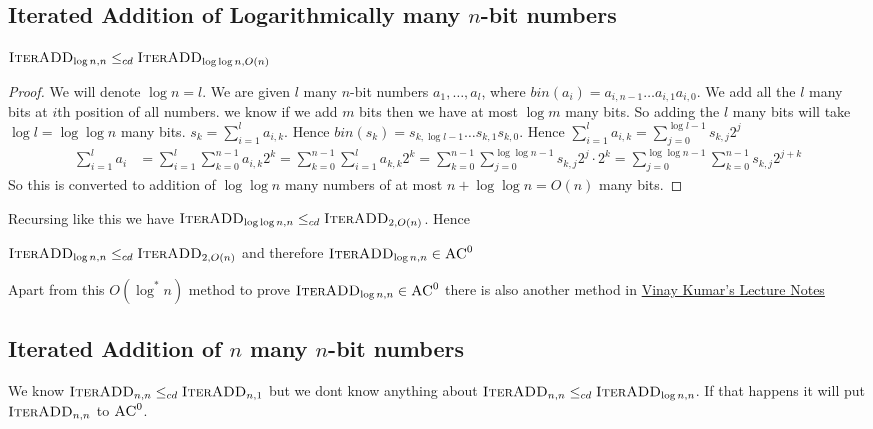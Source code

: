 \subsection{Iterated Addition of Logarithmically many $n$-bit numbers}
\begin{theorem}\label{addlognloglogn}
	$\textsc{IterADD}_{\log n,n}\leq_{cd} \textsc{IterADD}_{\log\log n,O(n)}$
\end{theorem}
\begin{proof}
	We will denote $\log n=l$. We are given $l$ many $n$-bit numbers $a_1,\dots,a_l$, where $bin(a_i)=a_{i,n-1}\dots a_{i,1}a_{i,0}$. We add all the $l$ many bits at $i$th position of all numbers. we know if we add $m$ bits then we have at most $\log m$ many bits. So adding the $l$ many bits will take $\log l=\log\log n$ many bits. $s_{k}=\sum\limits_{i=1}^l a_{i,k}$. Hence $bin(s_k)= s_{k,\log l-1}\dots s_{k,1}s_{k,0}$. Hence $\sum\limits_{i=1}^{l}a_{i,k}=\sum\limits_{j=0}^{\log l-1}s_{k,j}2^j$
\begin{align*}
	\sum\limits_{i=1}^{l}a_{i}&=\sum\limits_{i=1}^{l}\sum\limits_{k=0}^{n-1}a_{i,k}2^k=\sum\limits_{k=0}^{n-1}\sum\limits_{i=1}^{l}a_{k,k}2^k= \sum\limits_{k=0}^{n-1} \sum\limits_{j=0}^{\log\log n-1}s_{k,j}2^j\cdot 2^k= \sum\limits_{j=0}^{\log\log n-1}\sum\limits_{k=0}^{n-1}s_{k,j}2^{j+k}
\end{align*}So this is converted to addition of $\log\log n$ many numbers of at most $n+\log\log n=O(n)$ many bits. 
\end{proof}
Recursing like this we have $\textsc{IterADD}_{\log\log n,n}\leq _{cd} \textsc{IterADD}_{2,O(n)}$. Hence
\begin{theorem}\label{addlognac0}
$\textsc{IterADD}_{\log n,n}\leq _{cd} \textsc{IterADD}_{2,O(n)}$ and therefore $\textsc{IterADD}_{\log n,n}\in \textsc{AC}^0$
\end{theorem}

\begin{remark}
	Apart from this $O(\log^*n)$ method to prove $\textsc{IterADD}_{\log n,n}\in \textsc{AC}^0$ there is also another method in \href{https://www.iarcs.org.in/activities/elnotes/pdf/cc.pdf}{Vinay Kumar's Lecture Notes}
\end{remark}
\subsection{Iterated Addition of $n$ many $n$-bit numbers}
We know $\textsc{IterADD}_{n,n}\leq _{cd} \textsc{IterADD}_{n,1}$ but we dont know anything about $\textsc{IterADD}_{n,n}\leq_{cd} \textsc{IterADD}_{\log n,n}$.  If that happens it will put $\textsc{IterADD}_{n,n}$ to $\textsc{AC}^0$.

